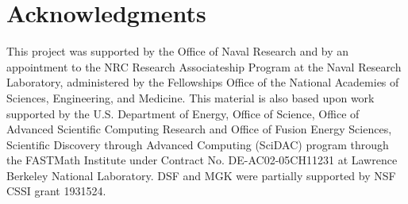 \documentclass[preprint,12pt]{elsarticle}
\theoremstyle{definition}
\begin{document}
\section*{Acknowledgments}

This project was supported by the Office of Naval Research and by an appointment to the NRC Research Associateship Program at the Naval Research Laboratory, administered by the Fellowships Office of the National Academies of Sciences, Engineering, and Medicine. This material is also based upon work supported by the U.S. Department of Energy, Office of Science, Office of Advanced Scientific Computing Research and Office of Fusion Energy Sciences, Scientific Discovery through Advanced Computing (SciDAC) program through the FASTMath Institute under Contract No. DE-AC02-05CH11231 at Lawrence Berkeley National Laboratory. DSF and MGK were partially supported by NSF CSSI grant 1931524.

\appendix



\end{document}
